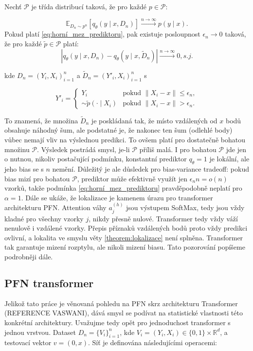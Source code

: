 \begin{theorem}
    Nechť $\mathcal{P}$ je třída distribucí taková, že pro každé $p \in \mathcal{P}$:

\begin{equation}
    \mathbb{E}_{D_n \sim p^n}[q_\theta(y \mid x, D_n)] \xrightarrow{n \to \infty} p(y \mid x).
\end{equation}
    Pokud platí \ref{eq:horní_mez_prediktoru}, pak existuje posloupnost $\epsilon_n \to 0$ taková, že pro každé $\tilde{p} \in \mathcal{P}$ platí:
\begin{equation}
    \left| q_\theta(y \mid x, D_n) - q_\theta(y \mid x, \tilde{D}_n) \right| \xrightarrow{n \to \infty} 0, s.j.
\end{equation}

    kde $D_n = (Y_i, X_i)_{i=1}^n$ a $\tilde{D}_n = (Y'_i, X_i)_{i=1}^n$ s

$$Y'_i = \begin{cases} Y_i & \text{pokud } \|X_i - x\| \leq \epsilon_n, \\ \sim \tilde{p}(\cdot \mid X_i) & \text{pokud } \|X_i - x\| > \epsilon_n. \end{cases}$$
\label{theorem:lokalizace}
\end{theorem}

To znamená, že množina $\tilde{D}_n$ je poskládaná tak, že místo vzdálených od $x$ bodů obsahuje náhodný šum, ale podstatné je, že nakonec ten šum (odlehlé body) vůbec nemají vliv na výslednou predikci.
To ovšem platí pro dostatečně bohatou množinu $\mathcal{P}$.
Výsledek postrádá smysl, je-li $\mathcal{P}$ příliš malá. 
I pro bohatou $\mathcal{P}$ jde jen o nutnou, nikoliv postačující podmínku, konstantní prediktor $q_\theta = 1$ je lokální, ale jeho bias se s $n$ nemění.
Důležitý je ale důsledek pro bias-variance tradeoff: pokud bias mizí pro bohatou $\mathcal{P}$, prediktor může efektivně využít jen $\epsilon_n n = o(n)$ vzorků, takže podmínka \ref{eq:horní_mez_prediktoru} pravděpodobně neplatí pro $\alpha = 1$. 
Dále se ukáže, že lokalizace je kamenem úrazu pro transformer architekturu PFN.
Attention váhy $a^{(h)}_j$ jsou výstupem SoftMax, tedy jsou vždy kladné pro všechny vzorky $j$, nikdy přesně nulové. 
Transformer tedy vždy váží nenulově i vzdálené vzorky. 
Přepis příznaků vzdálených bodů proto vždy predikci ovlivní, a lokalita ve smyslu věty \ref{theorem:lokalizace} není splněna. 
Transformer tak garantuje mizení rozptylu, ale nikoli mizení biasu.
Tato pozorování popíšeme podrobněji dále.

\subsection{PFN transformer}
Jelikož tato práce je věnovaná pohledu na PFN skrz architekturu Transformer (REFERENCE VASWANI), dává smysl se podívat na statistické vlastnosti této konkrétní architektury.
Uvažujme tedy opět  pro jednoduchost transformer s jednou vrstvou. 
Dataset $D_n = \{V_i\}_{i=1}^n$, kde $V_i = (Y_i, X_i) \in \{0,1\} \times \mathbb{R}^d$, a testovací vektor $v = (0, x)$. 
Síť je definována následujícími operacemi:

